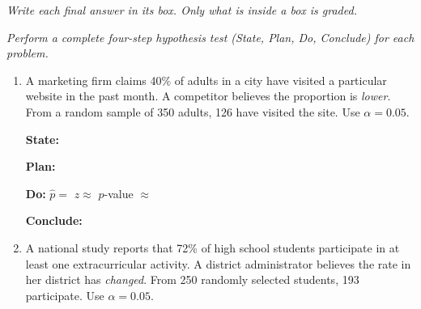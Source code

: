 \documentclass[10pt]{article}
\begin{document}
{\small\itshape Write each final answer in its box. Only what is inside a box is graded.}\par

\vspace{0.15in}

\textit{Perform a complete four-step hypothesis test (State, Plan, Do, Conclude) for each problem.}

\begin{enumerate}

  \item A marketing firm claims 40\% of adults in a city have visited a particular
        website in the past month. A competitor believes the proportion is \emph{lower}.
        From a random sample of 350 adults, 126 have visited the site. Use $\alpha=0.05$.

        \textbf{State:} 

        \textbf{Plan:} 

        \textbf{Do:} $\hat p = $ \rlap{\smash{\gradedblank[id=hw1c1, type=short, points=1, answer=0.36, check=numeric]{2cm}{0.17in}}}\phantom{\blank{2cm}} \quad $z \approx$ \rlap{\smash{\gradedblank[id=hw1c2, type=short, points=2, answer=-1.53, check=numeric, tolerance=0.02]{2cm}{0.17in}}}\phantom{\blank{2cm}} \quad $p$-value $\approx$ \rlap{\smash{\gradedblank[id=hw1c3, type=short, points=2, answer=0.063, check=numeric, tolerance=0.003]{2cm}{0.17in}}}\phantom{\blank{2cm}}

        \textbf{Conclude:} 

  \newpage
  \item A national study reports that 72\% of high school students participate in at
        least one extracurricular activity. A district administrator believes the rate
        in her district has \emph{changed}. From 250 randomly selected students, 193
        participate. Use $\alpha=0.05$.


\end{enumerate}
\end{document}
